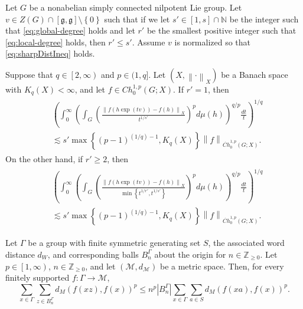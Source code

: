 \documentclass[10pt,a4paper]{amsart}
\begin{document}
\begin{theorem}\label{thm:nilpotentVvsH}
Let $G$ be a nonabelian simply connected nilpotent Lie group. Let $v\in Z\left(G\right)\cap\left[\mathfrak{g},\mathfrak{g}\right]\setminus \left\{0\right\}$ such that if we let $s'\in \left[1,s\right]\cap \mathbb{N}$ be the integer such that \eqref{eq:global-degree} holds and let $r'$ be the smallest positive integer such that \eqref{eq:local-degree} holds, then $r'\le s'$. Assume $v$ is normalized so that \eqref{eq:sharpDistIneq} holds.

Suppose that $q\in \left[2,\infty\right)$ and $p\in (1,q]$. Let $\left(X,\left\|\cdot\right\|_X\right)$ be a Banach space with $K_q\left(X\right)<\infty$, and let $f\in Ch_0^{1,p}\left(G;X\right)$. If $r'=1$, then
\begin{align}\label{eq:nilpotentVvsH-r'=1}
\begin{aligned}
&\left(\int_0^\infty \left(\int_{G}\left(\frac{\left\|f\left(h\exp\left(tv\right)\right)-f\left(h\right)\right\|_X}{t^{1/s'}}\right)^pd\mu\left(h\right)\right)^{q/p}\frac{dt}{t}\right)^{1/q}\\
&\lesssim s'\max\left\{\left(p-1\right)^{(1/q)-1},K_q\left(X\right)\right\} \left\|f\right\|_{\dot{Ch}_0^{1,p}\left(G;X\right)}.
\end{aligned}
\end{align}
On the other hand, if $r'\ge 2$, then
\begin{align}\label{eq:nilpotentVvsH-r'>1}
\begin{aligned}
&\left(\int_0^\infty \left(\int_{G}\left(\frac{\left\|f\left(h\exp\left(tv\right)\right)-f\left(h\right)\right\|_X}{\min\left\{t^{1/r'},t^{1/s'}\right\}}\right)^pd\mu\left(h\right)\right)^{q/p}\frac{dt}{t}\right)^{1/q}\\
&\lesssim s'\max\left\{\left(p-1\right)^{(1/q)-1},K_q\left(X\right)\right\} \left\|f\right\|_{\dot{Ch}_0^{1,p}\left(G;X\right)}.
\end{aligned}
\end{align}
\end{theorem}

\begin{lemma}\label{lem:global poincare-simple} Let $\Gamma$ be a group with finite symmetric generating set $S$, the associated word distance $d_W$, and corresponding balls $B_n^\Gamma$ about the origin for $n\in \mathbb{Z}_{\ge 0}$. Let $p\in \left[1,\infty\right)$, $n\in \mathbb{Z}_{\ge 0}$, and let $\left(\mathcal{M},d_\mathcal{M}\right)$ be a metric space. Then, for every finitely supported $f:\Gamma\to \mathcal{M}$,
\[
\sum_{x\in \Gamma}\sum_{z\in B^\Gamma_n} d_M\left(f\left(xz\right),f\left(x\right)\right)^p\le n^{p}\left|B^\Gamma_n\right| \sum_{x\in \Gamma} \sum_{a\in S}d_M\left(f\left(xa\right),f\left(x\right)\right)^p.
\]
\end{lemma}
\end{document}
